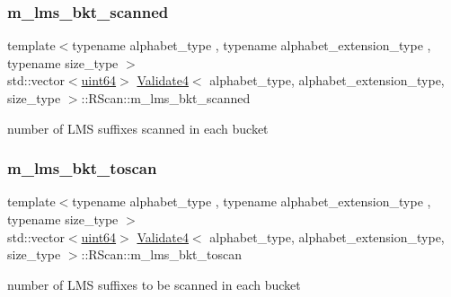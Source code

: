 \mbox{\label{struct_validate4_1_1_r_scan_ab56ecfb052c910af7ed356d5ad11be0b}} 
\subsubsection{\texorpdfstring{m\+\_\+lms\+\_\+bkt\+\_\+scanned}{m\_lms\_bkt\_scanned}}
{\footnotesize\ttfamily template$<$typename alphabet\+\_\+type , typename alphabet\+\_\+extension\+\_\+type , typename size\+\_\+type $>$ \\
std\+::vector$<$\hyperlink{types_8h_a60e8696a4678cd348e991a1f172e53f7}{uint64}$>$ \hyperlink{class_validate4}{Validate4}$<$ alphabet\+\_\+type, alphabet\+\_\+extension\+\_\+type, size\+\_\+type $>$\+::R\+Scan\+::m\+\_\+lms\+\_\+bkt\+\_\+scanned\hspace{0.3cm}{\ttfamily [private]}}



number of L\+MS suffixes scanned in each bucket 

\mbox{\label{struct_validate4_1_1_r_scan_a9681af9f2bc82ec9202da5c967f36491}} 
\subsubsection{\texorpdfstring{m\+\_\+lms\+\_\+bkt\+\_\+toscan}{m\_lms\_bkt\_toscan}}
{\footnotesize\ttfamily template$<$typename alphabet\+\_\+type , typename alphabet\+\_\+extension\+\_\+type , typename size\+\_\+type $>$ \\
std\+::vector$<$\hyperlink{types_8h_a60e8696a4678cd348e991a1f172e53f7}{uint64}$>$ \hyperlink{class_validate4}{Validate4}$<$ alphabet\+\_\+type, alphabet\+\_\+extension\+\_\+type, size\+\_\+type $>$\+::R\+Scan\+::m\+\_\+lms\+\_\+bkt\+\_\+toscan\hspace{0.3cm}{\ttfamily [private]}}



number of L\+MS suffixes to be scanned in each bucket 

